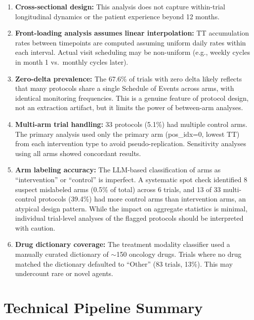 \documentclass[11pt,a4paper]{article}
\begin{document}
\begin{enumerate}
    \item \textbf{Cross-sectional design:} This analysis does not capture within-trial longitudinal dynamics or the patient experience beyond 12 months.

    \item \textbf{Front-loading analysis assumes linear interpolation:} TT accumulation rates between timepoints are computed assuming uniform daily rates within each interval. Actual visit scheduling may be non-uniform (e.g., weekly cycles in month 1 vs.\ monthly cycles later).

    \item \textbf{Zero-delta prevalence:} The 67.6\% of trials with zero delta likely reflects that many protocols share a single Schedule of Events across arms, with identical monitoring frequencies. This is a genuine feature of protocol design, not an extraction artifact, but it limits the power of between-arm analyses.

    \item \textbf{Multi-arm trial handling:} 33 protocols (5.1\%) had multiple control arms. The primary analysis used only the primary arm (pos\_idx=0, lowest TT) from each intervention type to avoid pseudo-replication. Sensitivity analyses using all arms showed concordant results.

    \item \textbf{Arm labeling accuracy:} The LLM-based classification of arms as ``intervention'' or ``control'' is imperfect. A systematic spot check identified 8 suspect mislabeled arms (0.5\% of total) across 6 trials, and 13 of 33 multi-control protocols (39.4\%) had more control arms than intervention arms, an atypical design pattern. While the impact on aggregate statistics is minimal, individual trial-level analyses of the flagged protocols should be interpreted with caution.

    \item \textbf{Drug dictionary coverage:} The treatment modality classifier used a manually curated dictionary of $\sim$150 oncology drugs. Trials where no drug matched the dictionary defaulted to ``Other'' (83 trials, 13\%). This may undercount rare or novel agents.
\end{enumerate}

\section{Technical Pipeline Summary}
\end{document}

